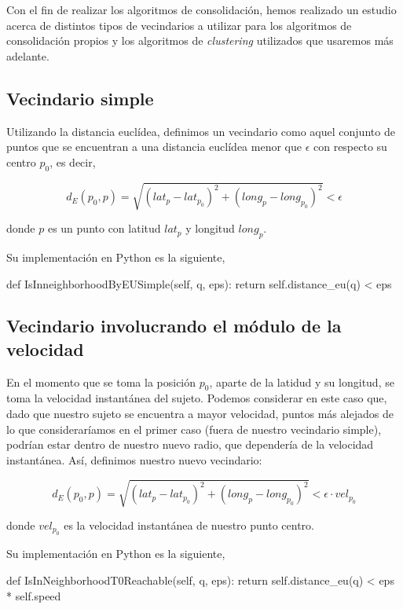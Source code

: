 \documentclass[a4paper, 12pt]{article}
\begin{document}
Con el fin de realizar los algoritmos de consolidaci\'on, hemos realizado un estudio acerca de distintos tipos de vecindarios a utilizar para los algoritmos de consolidaci\'on propios y los algoritmos de \textit{clustering} utilizados que usaremos m\'as adelante.

\subsection{Vecindario simple}

Utilizando la distancia eucl\'idea, definimos un vecindario como aquel conjunto de puntos que se  encuentran a una distancia eucl\'idea menor que $\epsilon$ con respecto su centro $p_0$, es decir,

$$ d_E(p_0, p) = \sqrt{(lat_{p} - lat_{p_0})^2 + (long_{p} - long_{p_0})^2 } < \epsilon $$

donde $p$ es un punto con latitud $lat_{p}$ y longitud $long_{p}$.

Su implementaci\'on en Python es la siguiente,

\begin{python}
        def IsInneighborhoodByEUSimple(self, q, eps):
                return self.distance_eu(q) < eps
\end{python}


\subsection{Vecindario involucrando el m\'odulo de la velocidad}

En el momento que se toma la posici\'on $p_0$, aparte de la latidud y su longitud, se toma la velocidad instant\'anea del sujeto. Podemos considerar en este caso que, dado que nuestro sujeto se  encuentra a mayor velocidad, puntos m\'as alejados de lo que considerar\'iamos en el primer caso (fuera de nuestro vecindario simple), podr\'ian estar dentro de nuestro nuevo radio, que depender\'ia de la velocidad instant\'anea. As\'i, definimos nuestro nuevo vecindario:

$$ d_E(p_0, p) = \sqrt{(lat_{p} - lat_{p_0})^2 + (long_{p} - long_{p_0})^2 } < \epsilon \cdot vel_{p_0} $$

donde $vel_{p_0}$ es la velocidad instant\'anea de nuestro punto centro.


Su implementaci\'on en Python es la siguiente,

\begin{python}
        def IsInNeighborhoodT0Reachable(self, q, eps):
                return self.distance_eu(q) < eps * self.speed
\end{python}
\end{document}
